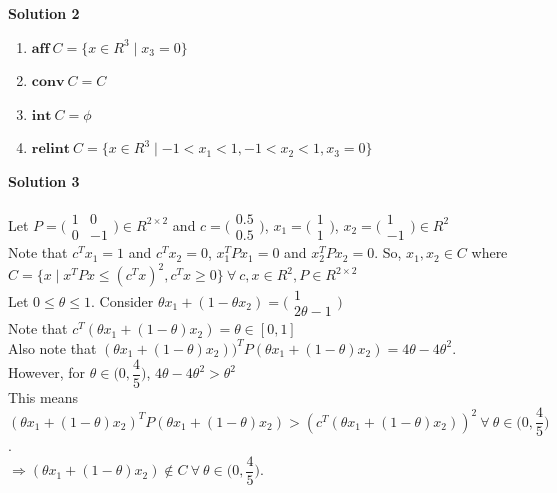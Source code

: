 \documentclass{article}
\begin{document}
\begin{flushleft}
\textbf{Solution 2}
\begin{enumerate}
	\item $\textbf{aff}\ C=\{x \in R^{3}\mid x_{3}=0\}$
	\item $\textbf{conv}\ C=C$
	\item $\textbf{int}\ C=\phi$
	\item $\textbf{relint}\ C=\{x\in R^{3}\mid-1<x_{1}<1,-1<x_{2}<1,x_{3}=0\}$
\end{enumerate}
\textbf{Solution 3}\\~\\
Let $P=
\Bigg(\begin{matrix}
  1 & 0\\
  0 & -1
\end{matrix}\Bigg) \in R^{2 \times 2}$ and $c=\Bigg(\begin{matrix}
  0.5\\
  0.5
\end{matrix}\Bigg)$, $x_{1}=\Bigg(\begin{matrix}
  1\\
  1
\end{matrix}\Bigg)$, $x_{2}=\Bigg(\begin{matrix}
  1\\
  -1
\end{matrix}\Bigg) \in R^{2}$\\
Note that $c^{T}x_{1}=1$ and $c^{T}x_{2}=0$, $x_{1}^{T}Px_{1}=0$ and $x_{2}^{T}Px_{2}=0$. So, $x_{1}, x_{2} \in C$ where $C=\{x\mid x^{T}Px\leq (c^{T}x)^{2}, c^{T}x\geq 0\} \ \forall\  c,x \in R^{2}, P\in R^{2\times 2}$\\
Let $0\leq\theta\leq1$. Consider $\theta x_{1}+(1-\theta x_{2})=\Bigg(\begin{matrix}
  1\\
  2\theta-1
\end{matrix}\Bigg)$\\
Note that $c^{T}(\theta x_{1}+(1-\theta)x_{2})=\theta \in [0,1]$\\
Also note that $(\theta x_{1}+(1-\theta)x_{2}))^{T}P(\theta x_{1}+(1-\theta)x_{2})=4\theta-4\theta^{2}$.\\
However, for $\theta\in\Big(0,\dfrac{4}{5}\Big)$, $4\theta-4\theta^{2}>\theta^{2}$\\
This means $(\theta x_{1}+(1-\theta)x_{2})^{T}P(\theta x_{1}+(1-\theta)x_{2})>(c^{T}(\theta x_{1}+(1-\theta)x_{2}))^{2}\ \forall\  \theta \in \Big(0,\dfrac{4}{5}\Big)$.\\
$\Rightarrow (\theta x_{1}+(1-\theta)x_{2})\not \in C\  \forall\  \theta \in \Big(0,\dfrac{4}{5}\Big)$.\\

\end{flushleft}
\end{document}
